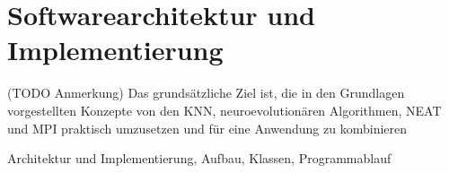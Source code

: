 \chapter{Softwarearchitektur und Implementierung}
\label{chap:software_architecture}
(TODO Anmerkung)
Das grundsätzliche Ziel ist, die in den Grundlagen vorgestellten Konzepte von den \ac{KNN}, neuroevolutionären Algorithmen, \ac{NEAT} und \ac{MPI} praktisch umzusetzen und für eine Anwendung zu kombinieren

Architektur und Implementierung, Aufbau, Klassen, Programmablauf

